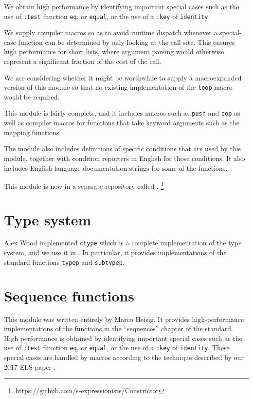 We obtain high performance by identifying important special
cases such as the use of \texttt{:test} function \texttt{eq}, or
\texttt{equal}, or the use of a \texttt{:key} of \texttt{identity}.

We supply compiler macros so as to avoid runtime dispatch whenever a
special-case function can be determined by only looking at the call
site.  This ensures high performance for short lists, where argument
parsing would otherwise represent a significant fraction of the cost
of the call.

We are considering whether it might be worthwhile to supply a
macroexpanded version of this module so that no existing
implementation of the \texttt{loop} macro would be required. 

This module is fairly complete, and it includes macros such as
\texttt{push} and \texttt{pop} as well as compiler macros for
functions that take keyword arguments such as the mapping functions. 

The module also includes definitions of specific conditions that are
used by this module, together with condition reporters in English for
those conditions.  It also includes English-language documentation
strings for some of the functions. 

This module is now in a separate repository called \constrictor{}.%
\footnote{https://github.com/s-expressionists/Constrictor}

\section{Type system}
\label{sec-type-system}

Alex Wood implemented \texttt{ctype} which is a complete
implementation of the \commonlisp{} type system, and we use it in
\sysname{}.  In particular, it provides implementations of the
standard functions \texttt{typep} and \texttt{subtypep}.

\section{Sequence functions}
\label{sec-sequence-functions}

This module was written entirely by Marco Heisig.  It provides
high-performance implementations of the functions in the ``sequences''
chapter of the \commonlisp{} standard.  High performance is obtained
by identifying important special cases such as the use of
\texttt{:test} function \texttt{eq}, or \texttt{equal}, or the use of
a \texttt{:key} of \texttt{identity}.  These special cases are handled
by macros according to the technique described by our 2017 ELS paper
\cite{Durand:2017:ELS:Sequence}.


